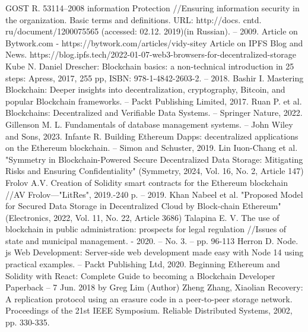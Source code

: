 \documentclass[10pt,conference,a4paper]{IEEEtran_EDM}
\begin{document}
\begin{thebibliography}{00}
 GOST R. 53114–2008 information Protection //Ensuring information security in the organization. Basic terms and definitions. URL: http://docs. cntd. ru/document/1200075565 (accessed: 02.12. 2019)(in Russian). – 2009.
 Article on Bytwork.com - https://bytwork.com/articles/vidy-sitey
 Article on IPFS Blog and News. https://blog.ipfs.tech/2022-01-07-web3-browsers-for-decentralized-storage
 Kube N. Daniel Drescher: Blockchain basics: a non-technical introduction in 25 steps: Apress, 2017, 255 pp, ISBN: 978-1-4842-2603-2. – 2018. 
 Bashir I. Mastering Blockchain: Deeper insights into decentralization, cryptography, Bitcoin, and popular Blockchain frameworks. – Packt Publishing Limited, 2017.
 Ruan P. et al. Blockchains: Decentralized and Verifiable Data Systems. – Springer Nature, 2022.
 Gillenson M. L. Fundamentals of database management systems. – John Wiley and Sons, 2023.
 Infante R. Building Ethereum Dapps: decentralized applications on the Ethereum blockchain. – Simon and Schuster, 2019.
 Lin Iuon-Chang et al. "Symmetry in Blockchain-Powered Secure Decentralized Data Storage: Mitigating Risks and Ensuring Confidentiality" (Symmetry, 2024, Vol. 16, No. 2, Article 147) 
 Frolov A.V. Creation of Solidity smart contracts for the Ethereum blockchain //AV Frolov—"LitRes", 2019.-240 p. – 2019.
 Khan Nabeel et al. "Proposed Model for Secured Data Storage in Decentralized Cloud by Block-chain Ethereum" (Electronics, 2022, Vol. 11, No. 22, Article 3686)  
 Talapina E. V. The use of blockchain in public administration: prospects for legal regulation //Issues of state and municipal management. - 2020. – No. 3. – pp. 96-113
 Herron D. Node. js Web Development: Server-side web development made easy with Node 14 using practical examples. – Packt Publishing Ltd, 2020.
 Beginning Ethereum and Solidity with React: Complete Guide to becoming a Blockchain Developer Paperback – 7 Jun. 2018 by Greg Lim (Author)
 Zheng Zhang, Xiaolian Recovery: A replication protocol using an erasure code in a peer-to-peer storage network. Proceedings of the 21st IEEE Symposium. Reliable Distributed Systems, 2002, pp. 330-335.

\end{thebibliography}
\end{document}
